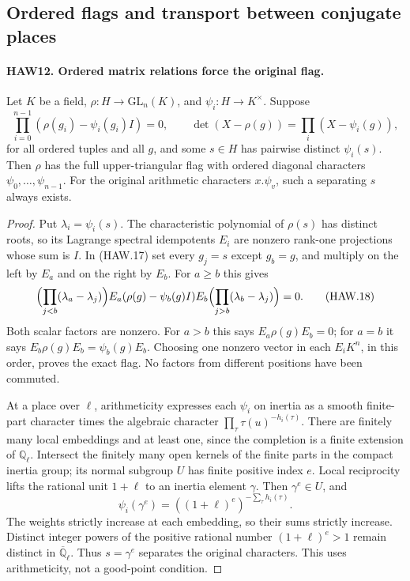 \documentclass[11pt,a4paper]{article}
\numberwithin{equation}{section}
\theoremstyle{remark}\newtheorem{remark}[theorem]{Remark}
\begin{document}
\subsection{Ordered flags and transport between conjugate places}

\paragraph{HAW12. Ordered matrix relations force the original flag.}
\label{claim:HAW12}
Let $K$ be a field, $\rho:H\to\mathrm{GL}_n(K)$, and
$\psi_i:H\to K^\times$.  Suppose
\[
 \prod_{i=0}^{n-1}(\rho(g_i)-\psi_i(g_i)I)=0,\qquad
 \det(X-\rho(g))=\prod_i(X-\psi_i(g)),
 \tag{HAW.17}
\]
for all ordered tuples and all $g$, and some $s\in H$
has pairwise distinct $\psi_i(s)$.  Then $\rho$ has the
full upper-triangular flag with ordered diagonal characters
$\psi_0,\ldots,\psi_{n-1}$.  For the original arithmetic
characters $x.\psi_v$, such a separating $s$ always exists.
\begin{proof}
Put $\lambda_i=\psi_i(s)$.  The characteristic polynomial
of $\rho(s)$ has distinct roots, so its Lagrange spectral
idempotents $E_i$ are nonzero rank-one projections whose sum
is $I$.  In (HAW.17) set every $g_j=s$ except $g_b=g$,
and multiply on the left by $E_a$ and on the right by $E_b$.
For $a\ge b$ this gives
\[
 \Bigl(\prod_{j<b}(\lambda_a-\lambda_j)\Bigr)
 E_a(\rho(g)-\psi_b(g)I)E_b
 \Bigl(\prod_{j>b}(\lambda_b-\lambda_j)\Bigr)=0.
 \tag{HAW.18}
\]
Both scalar factors are nonzero.  For $a>b$ this says
$E_a\rho(g)E_b=0$; for $a=b$ it says
$E_b\rho(g)E_b=\psi_b(g)E_b$.  Choosing one nonzero vector
in each $E_iK^n$, in this order, proves the exact flag.
No factors from different positions have been commuted.

At a place over $\ell$, arithmeticity expresses each
$\psi_i$ on inertia as a smooth finite-part character times
the algebraic character $\prod_\tau\tau(u)^{-h_i(\tau)}$.
There are finitely many local embeddings and at least one,
since the completion is a finite extension of $\mathbb Q_\ell$.
Intersect the finitely many open kernels of the finite parts
in the compact inertia group; its normal subgroup $U$ has
finite positive index $e$.  Local reciprocity lifts the
rational unit $1+\ell$ to an inertia element $\gamma$.
Then $\gamma^e\in U$, and
\[
       \psi_i(\gamma^e)
                  =((1+\ell)^e)^{-\sum_\tau h_i(\tau)}.
 \tag{HAW.19}
\]
The weights strictly increase at each embedding, so their
sums strictly increase.  Distinct integer powers of the
positive rational number $(1+\ell)^e>1$ remain distinct
in $\overline{\mathbb Q}_\ell$.  Thus $s=\gamma^e$
separates the original characters.  This uses arithmeticity,
not a good-point condition.
\end{proof}
\end{document}
